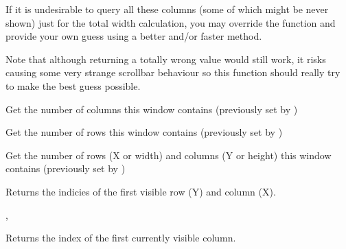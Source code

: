 If it is undesirable to query all these columns (some of which might be never
shown) just for the total width calculation, you may override the function and
provide your own guess using a better and/or faster method.

Note that although returning a totally wrong value would still work, it risks
causing some very strange scrollbar behaviour so this function should really
try to make the best guess possible.


\label{wxhvscrolledwindowgetcolumncount}


Get the number of columns this window contains (previously set by 
)


\label{wxhvscrolledwindowgetrowcount}


Get the number of rows this window contains (previously set by 
)


\label{wxhvscrolledwindowgetrowcolumncounts}


Get the number of rows (X or width) and columns (Y or height) this window
contains (previously set
by )


\label{wxhvscrolledwindowgetvisiblebegin}


Returns the indicies of the first visible row (Y) and column (X).


, 


\label{wxhvscrolledwindowgetvisiblecolumnsbegin}


Returns the index of the first currently visible column.

